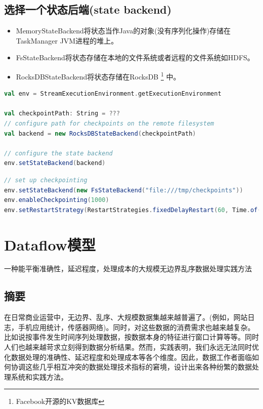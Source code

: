 \documentclass[oneside]{ctexbook}
\begin{document}
\section{选择一个状态后端(state backend)}

\begin{itemize}
\item MemoryStateBackend将状态当作Java的对象(没有序列化操作)存储在TaskManager JVM进程的堆上。
\item FsStateBackend将状态存储在本地的文件系统或者远程的文件系统如HDFS。
\item RocksDBStateBackend将状态存储在RocksDB \footnote{Facebook开源的KV数据库} 中。
\end{itemize}

\begin{lstlisting}[language=scala]
val env = StreamExecutionEnvironment.getExecutionEnvironment

val checkpointPath: String = ???
// configure path for checkpoints on the remote filesystem
val backend = new RocksDBStateBackend(checkpointPath)

// configure the state backend
env.setStateBackend(backend)
\end{lstlisting}

\begin{lstlisting}[language=scala]
// set up checkpointing
env.setStateBackend(new FsStateBackend("file:///tmp/checkpoints"))
env.enableCheckpointing(1000)
env.setRestartStrategy(RestartStrategies.fixedDelayRestart(60, Time.of(10, TimeUnit.SECONDS)))
\end{lstlisting}

\chapter{Dataflow模型}

一种能平衡准确性，延迟程度，处理成本的大规模无边界乱序数据处理实践方法

\section{摘要}

在日常商业运营中，无边界、乱序、大规模数据集越来越普遍了。(例如，网站日志，手机应用统计，传感器网络)。同时，对这些数据的消费需求也越来越复杂。比如说按事件发生时间序列处理数据，按数据本身的特征进行窗口计算等等。同时人们也越来越苛求立刻得到数据分析结果。然而，实践表明，我们永远无法同时优化数据处理的准确性、延迟程度和处理成本等各个维度。因此，数据工作者面临如何协调这些几乎相互冲突的数据处理技术指标的窘境，设计出来各种纷繁的数据处理系统和实践方法。
\end{document}
